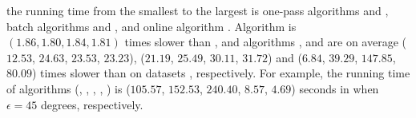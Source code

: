  the running time from the smallest to the
largest is one-pass algorithms \intersec and \interval, batch algorithms \tpa and \dpa, and online algorithm \opwa.
%
%
Algorithm \interval is $(1.86,1.80, 1.84, 1.81)$ times slower than \intersec, and algorithms \tpa, \dpa and \opwa are on average
($12.53$, $24.63$, $23.53$, $23.23$), ($21.19$, $25.49$, $30.11$, $31.72$) and ($6.84$, $39.29$, $147.85$, $80.09$)
times slower than \intersec on datasets \dSets, respectively.
%
For example, the running time of algorithms
(\tpa, \dpa, \opwa, \interval, \intersec) is ($105.57$, $152.53$, $240.40$, $8.57$, $4.69$) seconds in \mopsi when
$\epsilon=45$ degrees, respectively.

